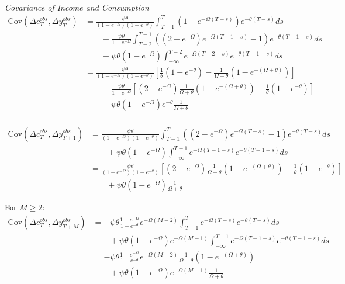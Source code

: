 \textit{Covariance of Income and Consumption}\\
\begin{align*}
\mathrm{Cov}(\Delta c_T^{obs},\Delta y_{T}^{obs}) 
&=\frac{\psi \theta}{(1-e^{-\Omega})(1-e^{-\theta})}\int_{T-1}^{T}  ( 1 - e^{-\Omega (T-s)} ) e^{-\theta (T-s)}ds \\
& \qquad  - \frac{\psi \theta}{1-e^{-\Omega}} \int_{T-2}^{T-1}\left( (2-e^{-\Omega}) e^{-\Omega (T-1-s)} -1  \right)  e^{-\theta (T-1-s)}ds \\
& \qquad + \psi \theta (1-e^{-\Omega}) \int_{-\infty}^{T-2}  e^{-\Omega (T-2-s)}  e^{-\theta (T-1-s)}ds \\
&=\frac{\psi \theta}{(1-e^{-\Omega})(1-e^{-\theta})} \left[ \frac{1}{\theta}(1-e^{-\theta}) - \frac{1}{\Omega + \theta}(1-e^{-(\Omega+\theta)})  \right] \\
& \qquad  - \frac{\psi \theta}{1-e^{-\Omega}} \left[ (2-e^{-\Omega}) \frac{1}{\Omega + \theta}(1-e^{-(\Omega+\theta)}) - \frac{1}{\theta}(1-e^{-\theta})  \right] \\
& \qquad + \psi \theta (1-e^{-\Omega}) e^{-\theta} \frac{1}{\Omega + \theta} \\
\end{align*}

\begin{align*}
\mathrm{Cov}(\Delta c_{T}^{obs},\Delta y_{T+1}^{obs}) 
&= \frac{\psi \theta}{(1-e^{-\Omega})(1-e^{-\theta})} \int_{T-1}^{T}\left( (2-e^{-\Omega}) e^{-\Omega (T-s)} -1  \right) e^{-\theta (T-s)}ds \\
& \qquad +\psi \theta  (1-e^{-\Omega}) \int_{-\infty}^{T-1}  e^{-\Omega (T-1-s)} e^{-\theta (T-1-s)}ds \\
&= \frac{\psi \theta}{(1-e^{-\Omega})(1-e^{-\theta})} \left[ (2-e^{-\Omega})\frac{1}{\Omega + \theta}(1-e^{-(\Omega+\theta)}) - \frac{1}{\theta}(1-e^{-\theta})  \right] \\
& \qquad +\psi \theta  (1-e^{-\Omega}) \frac{1}{\Omega + \theta}
\end{align*}

For $M \geq 2$:
\begin{align*}
\mathrm{Cov}(\Delta c_T^{obs},\Delta y_{T+M}^{obs}) 
&= -\psi \theta\frac{1-e^{-\Omega}}{1-e^{-\theta}} e^{-\Omega (M-2)}\int_{T-1}^{T}  e^{-\Omega (T-s)} e^{-\theta (T-s)}ds \\
& \qquad + \psi \theta (1-e^{-\Omega})e^{-\Omega(M-1)} \int_{-\infty}^{T-1}  e^{-\Omega (T-1-s)} e^{-\theta (T-1-s)}ds \\
&= -\psi \theta\frac{1-e^{-\Omega}}{1-e^{-\theta}} e^{-\Omega (M-2)}\frac{1}{\Omega + \theta}(1-e^{-(\Omega+\theta)}) \\
& \qquad + \psi \theta (1-e^{-\Omega})e^{-\Omega(M-1)} \frac{1}{\Omega + \theta}
\end{align*}

